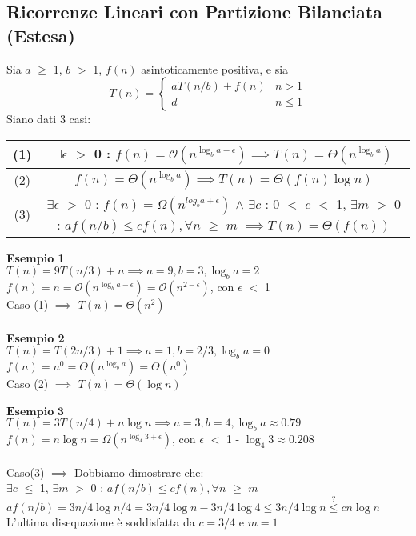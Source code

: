 \documentclass[../cheatSheetAlgoritmi.tex]{subfiles}
\begin{document}
\subsection{Ricorrenze Lineari con Partizione Bilanciata (Estesa)}
Sia $a$ $\geq$ 1, $b$ $>$ 1, $f(n)$ asintoticamente positiva, e sia
	\begin{equation*}
  		T(n)=\begin{cases}
    		aT(n/b) + f(n) & \text{$n > 1$}\\
    		d & \text{$n \leq 1$}
  		\end{cases}
	\end{equation*}
Siano dati 3 casi:\\
\begin{center}
	\renewcommand{\arraystretch}{1.2}
	\begin{tabular}{ |c|c| } 
		\hline
			(1) & $\exists \epsilon$ $>$ 0 : $f(n) = \mathcal{O}(n^{\log_{b}{a} - \epsilon}) \implies T(n) = \Theta(n^{\log_{b}{a}})$\\
		\hline
			(2) & $f(n) = \Theta(n^{\log_{b}{a}}) \implies T(n) = \Theta(f(n) \log{n})$\\
		\hline
			(3) & \makecell{$\exists \epsilon$ $>$ 0 : $f(n) = \Omega(n^{log_{b}{a} + \epsilon})$ $\wedge$ \\ $\exists c$ : 0 $<$ $c$ $<$ 1, $\exists m$ $>$ 0 : \\ $af(n/b) \leq cf(n), \forall n$ $\geq$ $m$} $\implies T(n) = \Theta(f(n))$ \\
		\hline
	\end{tabular}
\end{center}
\textbf{Esempio 1}\\
$T(n) = 9T(n/3) + n \implies a = 9, b = 3, \log_{b}{a} = 2$\\
$f(n) = n = \mathcal{O}(n^{\log_{b}{a} - \epsilon}) =  \mathcal{O}(n^{2 - \epsilon})$, con $\epsilon$ $<$ 1\\
Caso (1) $\implies$ $T(n) = \Theta(n^{2})$\\\\
\textbf{Esempio 2}\\
$T(n) = T(2n/3) + 1 \implies a = 1, b = 2/3, \log_{b}{a} = 0$\\
$f(n) = n^{0} = \Theta(n^{\log_{b}{a}}) =  \Theta(n^{0})$\\
Caso (2) $\implies$ $T(n) = \Theta(\log{n})$\\\\
$\textbf{Esempio 3}$\\
$T(n) = 3T(n/4) + n\log{n} \implies a = 3, b = 4, \log_{b}{a} \approx 0.79$\\
$f(n) = n\log{n} = \Omega(n^{\log_{4}{3} + \epsilon})$, con $\epsilon$ $<$ 1 - $\log_{4}{3} \approx 0.208$\\\\
Caso(3) $\implies$ Dobbiamo dimostrare che:\\
$\exists c$ $\leq$ 1, $\exists m$ $>$ 0 : $af(n/b) \leq cf(n), \forall n$ $\geq$ $m$\\
$af(n/b) = 3n/4\log{n/4} = 3n/4\log{n} - 3n/4\log{4} \leq 3n/4\log{n} \stackrel{?}{\leq} cn\log{n}$\\
L'ultima disequazione è soddisfatta da $c = 3/4$ e $m = 1$
\end{document}

